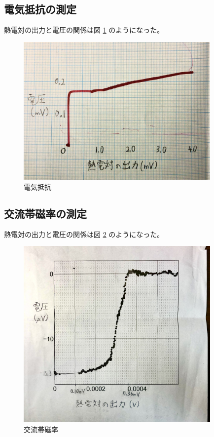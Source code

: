\documentclass[uplatex,dvipdfmx,a4paper,11pt]{jlreq}
\numberwithin{equation}{section}
\theoremstyle{definition}
\begin{document}
\subsection{電気抵抗の測定}
熱電対の出力と電圧の関係は図 \ref{fig:resistance} のようになった。
\begin{figure}[htbp]
  \centering
  \includegraphics[width=10cm]{./assets/YBCO_resistance.jpg}
  \caption{電気抵抗}
  \label{fig:resistance}
\end{figure}



\subsection{交流帯磁率の測定}
熱電対の出力と電圧の関係は図 \ref{fig:magnetic} のようになった。
\begin{figure}[htbp]
  \centering
  \includegraphics[width=10cm]{./assets/YBCO_magnetic.jpg}
  \caption{交流帯磁率}
  \label{fig:magnetic}
\end{figure}
\end{document}
